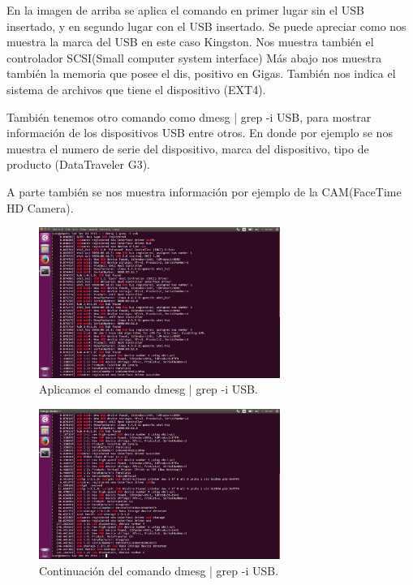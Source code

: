 En la imagen de arriba se aplica el comando en primer lugar sin el USB insertado, y en segundo lugar con el USB insertado. Se puede apreciar como nos muestra la marca del USB en este caso Kingston. Nos muestra también el controlador SCSI(Small computer system interface)
Más abajo nos muestra también la memoria que posee el dis, positivo en Gigas. También nos indica el sistema de archivos que tiene el dispositivo (EXT4).

También tenemos otro comando como dmesg | grep -i USB, para mostrar información de los dispositivos USB entre otros. En donde por ejemplo se nos muestra el numero de serie del dispositivo, marca del dispositivo, tipo de producto (DataTraveler G3).

A parte también se nos muestra información por ejemplo de la CAM(FaceTime HD Camera).

\begin{figure}[H]
	\begin{center}
		\includegraphics[width=0.7\textwidth]{Imagenes/Comando_dmesg_usb}
		\caption{Aplicamos el comando dmesg | grep -i USB.} \label{fig:7}
	\end{center}
\end{figure}

\begin{figure}[H]
	\begin{center}
		\includegraphics[width=0.7\textwidth]{Imagenes/Comando_dmesg_usb_2}
		\caption{Continuación del comando dmesg | grep -i USB.} \label{fig:7}
	\end{center}
\end{figure}
\newpage
